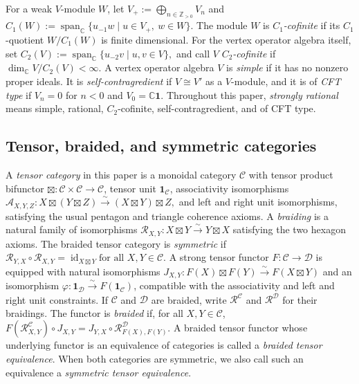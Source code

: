 \documentclass[10pt,a4paper]{amsart}
\numberwithin{equation}{section} \newtheorem{thm}{Theorem}[section] \newtheorem{lem}[thm]{Lemma} \newtheorem{ex}[thm]{Example} \newtheorem{prop}[thm]{Proposition} \newtheorem{cor}[thm]{Corollary} \newtheorem{defi}[thm]{Definition} \newtheorem{rmk}[thm]{Remark} \newtheorem{notation}[thm]{Notation}
\newcommand{\one}{\mathbf{1}}
\newcommand{\id}{\operatorname{id}}
\def\Z{\mathbb{Z}} \def\N{\mathbb{N}} \def\A{\mathbb{A}} \def\C{\mathbb{C}} \def\R{\mathbb{R}} \def\Q{\mathbb{Q}} \def\F{\mathbb{F}}
\begin{document}
For a weak $V$-module $W$, let \(V_+:=\bigoplus_{n\in\Z_{>0}}V_n\) and \(C_1(W):=\operatorname{span}_{\C}\{u_{-1}w\mid u\in V_+,\ w\in W\}\). The module $W$ is \emph{$C_1$-cofinite} if its $C_1$-quotient $W/C_1(W)$ is finite dimensional. For the vertex operator algebra itself, set \(C_2(V):=\operatorname{span}_{\C}\{u_{-2}v\mid u,v\in V\},\) and call $V$ \emph{$C_2$-cofinite} if \(\dim_\C V/C_2(V)<\infty\). A vertex operator algebra $V$ is \emph{simple} if it has no nonzero proper ideals. It is \emph{self-contragredient} if $V\cong V'$ as a $V$-module, and it is of \emph{CFT type} if \(V_n=0\) for $n<0$ and \(V_0=\C\one\). Throughout this paper, \emph{strongly rational} means simple, rational, $C_2$-cofinite, self-contragredient, and of CFT type.

\subsection{Tensor, braided, and symmetric categories}

A \emph{tensor category} in this paper is a monoidal category $\mathcal C$ with tensor product bifunctor \(\boxtimes:\mathcal C\times\mathcal C\longrightarrow\mathcal C\), tensor unit $\mathbf 1_{\mathcal C}$, associativity isomorphisms \(\mathcal A_{X,Y,Z}:X\boxtimes(Y\boxtimes Z)\overset{\sim}{\longrightarrow}(X\boxtimes Y)\boxtimes Z,\) and left and right unit isomorphisms, satisfying the usual pentagon and triangle coherence axioms. A \emph{braiding} is a natural family of isomorphisms \(\mathcal R_{X,Y}:X\boxtimes Y\overset{\sim}{\longrightarrow}Y\boxtimes X\) satisfying the two hexagon axioms. The braided tensor category is \emph{symmetric} if \(\mathcal R_{Y,X}\circ\mathcal R_{X,Y}=\id_{X\boxtimes Y}\text{for all }X,Y\in\mathcal C.\) A strong tensor functor $F:\mathcal C\to\mathcal D$ is equipped with natural isomorphisms \(J_{X,Y}:F(X)\boxtimes F(Y)\overset{\sim}{\longrightarrow}F(X\boxtimes Y)\) and an isomorphism \(\varphi:\mathbf 1_{\mathcal D}\overset{\sim}{\longrightarrow}F(\mathbf 1_{\mathcal C})\), compatible with the associativity and left and right unit constraints. If $\mathcal C$ and $\mathcal D$ are braided, write $\mathcal R^{\mathcal C}$ and $\mathcal R^{\mathcal D}$ for their braidings. The functor is \emph{braided} if, for all $X,Y\in\mathcal C$, \(F(\mathcal R^{\mathcal C}_{X,Y})\circ J_{X,Y}=J_{Y,X}\circ\mathcal R^{\mathcal D}_{F(X),F(Y)}.\) A braided tensor functor whose underlying functor is an equivalence of categories is called a \emph{braided tensor equivalence}. When both categories are symmetric, we also call such an equivalence a \emph{symmetric tensor equivalence}.
\end{document}
